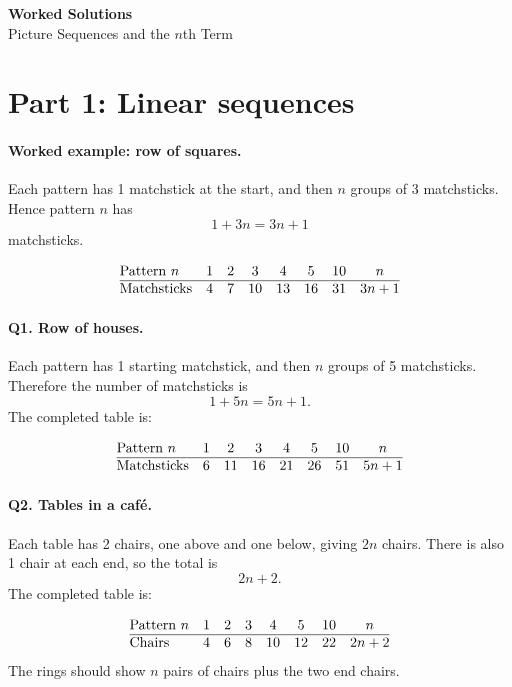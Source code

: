 \documentclass[11pt,a4paper]{article}
\begin{document}
\begin{center}
  {\Large\bfseries Worked Solutions}\\[2pt]
  {\large Picture Sequences and the \boldmath\(n\)th Term}
\end{center}

\section*{Part 1: Linear sequences}

\paragraph{Worked example: row of squares.}
Each pattern has 1 matchstick at the start, and then \(n\) groups of 3 matchsticks. Hence pattern \(n\) has
\[
1+3n=3n+1
\]
matchsticks.

\[
\begin{array}{@{}lccccccc@{}}
\text{Pattern }n&1&2&3&4&5&10&n\\ \hline
\text{Matchsticks}&4&7&10&13&16&31&3n+1
\end{array}
\]

\paragraph{Q1. Row of houses.}
Each pattern has 1 starting matchstick, and then \(n\) groups of 5 matchsticks. Therefore the number of matchsticks is
\[
1+5n=5n+1.
\]
The completed table is:

\[
\begin{array}{@{}lccccccc@{}}
\text{Pattern }n&1&2&3&4&5&10&n\\ \hline
\text{Matchsticks}&6&11&16&21&26&51&5n+1
\end{array}
\]

\paragraph{Q2. Tables in a caf\'e.}
Each table has 2 chairs, one above and one below, giving \(2n\) chairs. There is also 1 chair at each end, so the total is
\[
2n+2.
\]
The completed table is:

\[
\begin{array}{@{}lccccccc@{}}
\text{Pattern }n&1&2&3&4&5&10&n\\ \hline
\text{Chairs}&4&6&8&10&12&22&2n+2
\end{array}
\]
The rings should show \(n\) pairs of chairs plus the two end chairs.
\end{document}
